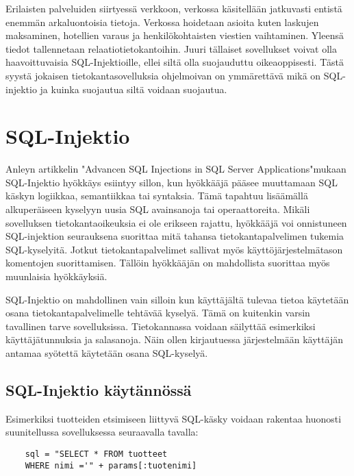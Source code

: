 \documentclass[finnish]{tktltiki2}
\theoremstyle{definition}
\theoremstyle{remark}
\begin{document}
	Erilaisten palveluiden siirtyessä verkkoon, verkossa käsitellään jatkuvasti entistä enemmän arkaluontoisia tietoja. Verkossa hoidetaan asioita kuten laskujen maksaminen, hotellien varaus ja henkilökohtaisten viestien vaihtaminen. Yleensä tiedot tallennetaan relaatiotietokantoihin. Juuri tällaiset sovellukset voivat olla haavoittuvaisia SQL-Injektioille, ellei siltä olla suojauduttu oikeaoppisesti. Tästä syystä jokaisen tietokantasovelluksia ohjelmoivan on ymmärettävä mikä on SQL-injektio ja kuinka suojautua siltä voidaan suojautua.
	

	
	
	
	\section{SQL-Injektio}
	
	Anleyn artikkelin "Advancen SQL Injections in SQL Server Applications"\space mukaan SQL-Injektio hyökkäys esiintyy sillon, kun hyökkääjä pääsee muuttamaan SQL käskyn logiikkaa, semantiikkaa tai syntaksia. Tämä tapahtuu lisäämällä alkuperäiseen kyselyyn uusia SQL avainsanoja tai operaattoreita.
	Mikäli sovelluksen tietokantaoikeuksia ei ole erikseen rajattu, hyökkääjä voi onnistuneen SQL-injektion seurauksena suorittaa mitä tahansa tietokantapalvelimen tukemia SQL-kyselyitä. Jotkut tietokantapalvelimet sallivat myös käyttöjärjestelmätason komentojen suorittamisen. Tällöin hyökkääjän on mahdollista suorittaa myös muunlaisia hyökkäyksiä. 
	
	SQL-Injektio on mahdollinen vain silloin kun käyttäjältä tulevaa tietoa käytetään osana tietokantapalvelimelle tehtävää kyselyä. Tämä on kuitenkin varsin tavallinen tarve sovelluksissa. Tietokannassa voidaan säilyttää esimerkiksi käyttäjätunnuksia ja salasanoja. Näin ollen kirjautuessa järjestelmään käyttäjän antamaa syötettä käytetään osana SQL-kyselyä.
	
	\subsection{SQL-Injektio käytännössä}
	
 Esimerkiksi tuotteiden etsimiseen liittyvä SQL-käsky voidaan rakentaa huonosti suunitellussa sovelluksessa seuraavalla tavalla:
 
	\begin{lstlisting}
	sql = "SELECT * FROM tuotteet
	WHERE nimi ='" + params[:tuotenimi]
	\end{lstlisting}
	
\end{document}
